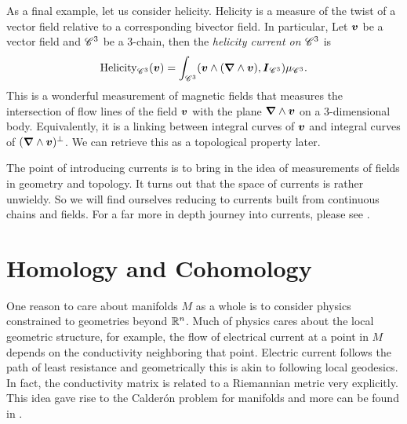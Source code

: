 \documentclass{article}
\begin{document}
\begin{example}[Helicity]
As a final example, let us consider helicity. Helicity is a measure of the twist of a vector field relative to a corresponding bivector field. In particular, Let $\boldsymbol{v}$ be a vector field and $\mathscr{C}^3$ be a 3-chain, then the \emph{helicity current on $\mathscr{C}^3$} is
\begin{equation}
    \mathrm{Helicity}_{\mathscr{C}^3}(\boldsymbol{v}) = \int_{\mathscr{C}^3}(\boldsymbol{v} \wedge (\boldsymbol{\nabla} \wedge \boldsymbol{v}), \boldsymbol{I}_{\mathscr{C}^3})\mu_{\mathscr{C}^3}.
\end{equation}
This is a wonderful measurement of magnetic fields that measures the intersection of flow lines of the field $\boldsymbol{v}$ with the plane $\boldsymbol{\nabla} \wedge\boldsymbol{v}$ on a 3-dimensional body. Equivalently, it is a linking between integral curves of $\boldsymbol{v}$ and integral curves of $(\boldsymbol{\nabla} \wedge \boldsymbol{v})^\perp$. We can retrieve this as a topological property later.
\end{example}

The point of introducing currents is to bring in the idea of measurements of fields in geometry and topology. It turns out that the space of currents is rather unwieldy. So we will find ourselves reducing to currents built from continuous chains and fields. For a far more in depth journey into currents, please see \cite{giaquinta_cartesian_1998}.


\section{Homology and Cohomology}
\label{sec:homology_and_cohomology}

One reason to care about manifolds $M$ as a whole is to consider physics constrained to geometries beyond $\mathbb{R}^n$. Much of physics cares about the local geometric structure, for example, the flow of electrical current at a point in $M$ depends on the conductivity neighboring that point. Electric current follows the path of least resistance and geometrically this is akin to following local geodesics. In fact, the conductivity matrix is related to a Riemannian metric very explicitly. This idea gave rise to the Calder\'on problem for manifolds and more can be found in .
\end{document}
